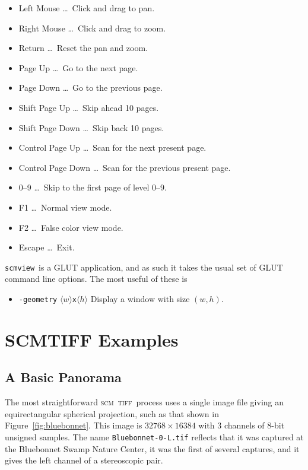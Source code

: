 \documentclass[oneside,10pt]{memoir}
\newcommand{\scm}     {\textsc{scm}}
\newcommand{\tiff}    {\textsc{tiff}}
\newcommand{\scmview} {\texttt{scmview}}
\newcommand{\inangles}[1]{$\langle$#1$\rangle$}
\newenvironment{optionlist}
  {\setlength{\leftmargini}{1in}\begin{itemize}}{\end{itemize}}
\begin{document}
\begin{Spacing}{1.1}
\begin{optionlist}
\item[Left Mouse] \ldots\ Click and drag to pan.
\item[Right Mouse] \ldots\ Click and drag to zoom.
\item[Return] \ldots\ Reset the pan and zoom.
\item[Page Up] \ldots\ Go to the next page.
\item[Page Down] \ldots\ Go to the previous page.
\item[Shift Page Up] \ldots\ Skip ahead 10 pages.
\item[Shift Page Down] \ldots\ Skip back 10 pages.
\item[Control Page Up] \ldots\ Scan for the next present page.
\item[Control Page Down] \ldots\ Scan for the previous present page.
\item[0--9] \ldots\ Skip to the first page of level 0--9.
\item[F1] \ldots\ Normal view mode.
\item[F2] \ldots\ False color view mode.
\item[Escape] \ldots\ Exit.
\end{optionlist}

\scmview\ is a \textsc{GLUT} application, and as such it takes the usual set of \textsc{GLUT} command line options. The most useful of these is

\begin{optionlist}
\item[\texttt{-geometry} \inangles{$w$}\texttt{x}\inangles{$h$}] Display a window with size $(w, h)$.
\end{optionlist}

\section{SCMTIFF Examples}

\subsection{A Basic Panorama}
\label{sec:panorama}

The most straightforward \scm\ \tiff\ process uses a single image file giving an equirectangular spherical projection, such as that shown in Figure~\ref{fig:bluebonnet}. This image is $\num{32768}\times\num{16384}$ with 3 channels of 8-bit unsigned samples. The name \texttt{Bluebonnet-0-L.tif} reflects that it was captured at the Bluebonnet Swamp Nature Center, it was the first of several captures, and it gives the left channel of a stereoscopic pair.


\end{Spacing}
\end{document}
